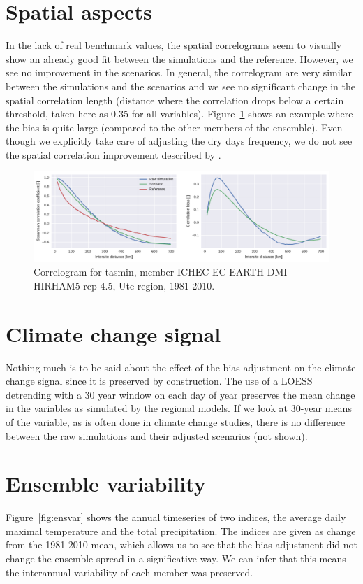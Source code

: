 \documentclass[letterpaper,10pt]{article}
\begin{document}
\section{Spatial aspects}
In the lack of real benchmark values, the spatial correlograms seem to visually show an already good fit between the simulations and the reference. However, we see no improvement in the scenarios. In general, the correlogram are very similar between the simulations and the scenarios and we see no significant change in the spatial correlation length (distance where the correlation drops below a certain threshold, taken here as 0.35 for all variables). Figure~\ref{fig:scorr} shows an example where the bias is quite large (compared to the other members of the ensemble). Even though we explicitly take care of adjusting the dry days frequency, we do not see the spatial correlation improvement described by \cite{Francois2020}.

\begin{figure}
\centering
\includegraphics[width=\textwidth]{../images/correlogram_tasmin_diags.pdf}
\caption{Correlogram for tasmin, member ICHEC-EC-EARTH DMI-HIRHAM5 rcp 4.5, Ute region, 1981-2010.}\label{fig:scorr}
\end{figure}

\section{Climate change signal}
Nothing much is to be said about the effect of the bias adjustment on the climate change signal since it is preserved by construction. The use of a LOESS detrending with a 30 year window on each day of year preserves the mean change in the variables as simulated by the regional models. If we look at 30-year means of the variable, as is often done in climate change studies, there is no difference between the raw simulations and their adjusted scenarios (not shown).

\section{Ensemble variability}
Figure~\ref{fig:ensvar} shows the annual timeseries of two indices, the average daily maximal temperature and the total precipitation. The indices are given as change from the 1981-2010 mean, which allows us to see that the bias-adjustment did not change the ensemble spread in a significative way. We can infer that this means the interannual variability of each member was preserved.
\end{document}
